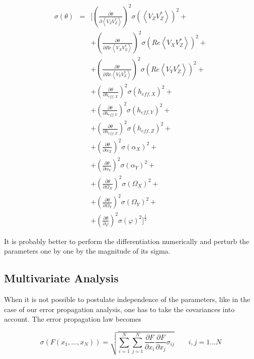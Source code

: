 \documentclass[a4paper,14pt]{extbook}
\begin{document}
\begin{eqnarray}
\sigma (\theta) &=&  [(\frac{\partial \theta}{\partial \left\langle V_Z V_Z^{*}\right\rangle})^2 \sigma ( \left\langle V_Z V_Z^{*}\right\rangle)^2+\\
&&+ (\frac{\partial \theta}{\partial Re \left\langle V_X V_Z^{*}\right\rangle})^2 \sigma (Re \left\langle V_X V_Z^{*}\right\rangle)^2+ \nonumber \\
&&+ (\frac{\partial \theta}{\partial Re \left\langle V_Y V_Z^{*}\right\rangle})^2 \sigma (Re \left\langle V_Y V_Z^{*}\right\rangle)^2+ \nonumber \\
&&+ (\frac{\partial \theta}{\partial h_{eff,X}})^2 \sigma (h_{eff,X})^2+ \nonumber \\
&&+ (\frac{\partial \theta}{\partial h_{eff,Y}})^2 \sigma (h_{eff,Y})^2+ \nonumber \\
&&+ (\frac{\partial \theta}{\partial h_{eff,Z}})^2 \sigma (h_{eff,Z})^2+ \nonumber \\
&&+ (\frac{\partial \theta}{\partial \alpha_X})^2 \sigma (\alpha_X)^2+ \nonumber \\
&&+ (\frac{\partial \theta}{\partial \alpha_Y})^2 \sigma (\alpha_Y)^2+ \nonumber \\
&&+ (\frac{\partial \theta}{\partial \Omega_X})^2 \sigma (\Omega_X)^2+ \nonumber \\
&&+ (\frac{\partial \theta}{\partial \Omega_Y})^2 \sigma (\Omega_Y)^2+ \nonumber \\
&&+ (\frac{\partial \theta}{\partial \varphi})^2 \sigma (\varphi)^2 ]^\frac{1}{2}\nonumber
\end{eqnarray}

It is probably better to perform the differentiation numerically and perturb the parameters one by one by the magnitude of its sigma.

\subsection{Multivariate Analysis}\label{susec_multivariat}

When it is not possible to postulate independence of the parameters, like in the case of our error propagation analysis, one has to take the covariances into account. The error propagation law becomes


\begin{equation}\label{error_prop_multi_variant}
\sigma (F(x_1,...,x_N))= \sqrt{\sum_{i=1}^N \sum_{j=1}^N \frac{\partial F}{\partial x_i} \frac{\partial F}{\partial x_j} \sigma_{ij} } \qquad i,j=1...N
\end{equation}
\end{document}
